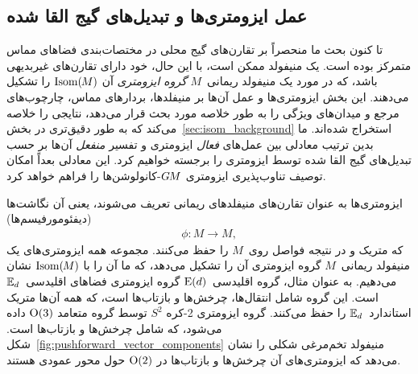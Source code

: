 

\subsection{عمل ایزومتری‌ها و تبدیل‌های گیج القا شده}
\label{sec:isometries_local}


تا کنون بحث ما منحصراً بر تقارن‌های گیج محلی در مختصات‌بندی فضاهای مماس متمرکز بوده است.
یک منیفولد ممکن است، با این حال، خود دارای تقارن‌های غیربدیهی باشد، که در مورد یک منیفولد ریمانی~$M$ \emph{گروه ایزومتری} آن $\operatorname{Isom}(\mkern-1.5mu M \mkern-.5mu)$ را تشکیل می‌دهند.
این بخش ایزومتری‌ها و عمل آن‌ها بر منیفلدها، بردارهای مماس، چارچوب‌های مرجع و میدان‌های ویژگی را به طور خلاصه مورد بحث قرار می‌دهد، نتایجی را خلاصه می‌کند که به طور دقیق‌تری در بخش~\ref{sec:isom_background} استخراج شده‌اند.
ما بدین ترتیب معادلی بین عمل‌های \emph{فعال} ایزومتری و تفسیر \emph{منفعل} آن‌ها بر حسب تبدیل‌های گیج القا شده توسط ایزومتری را برجسته خواهیم کرد.
این معادلی بعداً امکان توصیف تناوب‌پذیری ایزومتری $G\mkern-1.4muM$-کانولوشن‌ها را فراهم خواهد کرد.


ایزومتری‌ها به عنوان تقارن‌های منیفلدهای ریمانی تعریف می‌شوند، یعنی آن نگاشت‌ها (دیفئومورفیسم‌ها)
\begin{align}
	\phi: M \to M,
\end{align}
که متریک و در نتیجه فواصل روی~$M$ را حفظ می‌کنند.
مجموعه همه ایزومتری‌های یک منیفولد ریمانی~$M$ گروه ایزومتری آن را تشکیل می‌دهد، که ما آن را با $\operatorname{Isom}(\mkern-1.5mu M \mkern-.5mu)$ نشان می‌دهیم.
به عنوان مثال، گروه اقلیدسی~$\operatorname{E}(d)$ گروه ایزومتری فضاهای اقلیدسی~$\mathbb{E}_d$ است.
این گروه شامل انتقال‌ها، چرخش‌ها و بازتاب‌ها است، که همه آن‌ها متریک استاندارد~$\mathbb{E}_d$ را حفظ می‌کنند.
گروه ایزومتری 2-کره $S^2$ توسط گروه متعامد $\operatorname{O}(3)$ داده می‌شود، که شامل چرخش‌ها و بازتاب‌ها است.
شکل~\ref{fig:pushforward_vector_components} منیفولد تخم‌مرغی شکلی را نشان می‌دهد که ایزومتری‌های آن چرخش‌ها و بازتاب‌ها در $\operatorname{O}(2)$ حول محور عمودی هستند.



